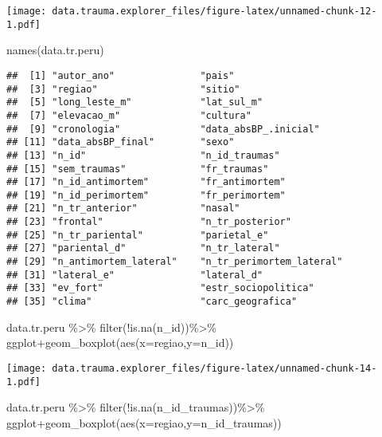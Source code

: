 \documentclass[
]{article}
\newenvironment{Shaded}{\begin{snugshade}}{\end{snugshade}}
\newcommand{\AttributeTok}[1]{\textcolor[rgb]{0.77,0.63,0.00}{#1}}
\newcommand{\FunctionTok}[1]{\textcolor[rgb]{0.00,0.00,0.00}{#1}}
\newcommand{\NormalTok}[1]{#1}
\newcommand{\SpecialCharTok}[1]{\textcolor[rgb]{0.00,0.00,0.00}{#1}}
\begin{document}
\texttt{[image: data.trauma.explorer\_files/figure-latex/unnamed-chunk-12-1.pdf]}

\begin{Shaded}
\begin{Highlighting}[]
\FunctionTok{names}\NormalTok{(data.tr.peru)}
\end{Highlighting}
\end{Shaded}

\begin{verbatim}
##  [1] "autor_ano"               "pais"                   
##  [3] "regiao"                  "sitio"                  
##  [5] "long_leste_m"            "lat_sul_m"              
##  [7] "elevacao_m"              "cultura"                
##  [9] "cronologia"              "data_absBP_.inicial"    
## [11] "data_absBP_final"        "sexo"                   
## [13] "n_id"                    "n_id_traumas"           
## [15] "sem_traumas"             "fr_traumas"             
## [17] "n_id_antimortem"         "fr_antimortem"          
## [19] "n_id_perimortem"         "fr_perimortem"          
## [21] "n_tr_anterior"           "nasal"                  
## [23] "frontal"                 "n_tr_posterior"         
## [25] "n_tr_pariental"          "parietal_e"             
## [27] "pariental_d"             "n_tr_lateral"           
## [29] "n_antimortem_lateral"    "n_tr_perimortem_lateral"
## [31] "lateral_e"               "lateral_d"              
## [33] "ev_fort"                 "estr_sociopolitica"     
## [35] "clima"                   "carc_geografica"
\end{verbatim}

\begin{Shaded}
\begin{Highlighting}[]
\NormalTok{data.tr.peru }\SpecialCharTok{\%\textgreater{}\%} \FunctionTok{filter}\NormalTok{(}\SpecialCharTok{!}\FunctionTok{is.na}\NormalTok{(n\_id))}\SpecialCharTok{\%\textgreater{}\%}\NormalTok{ ggplot}\SpecialCharTok{+}\FunctionTok{geom\_boxplot}\NormalTok{(}\FunctionTok{aes}\NormalTok{(}\AttributeTok{x=}\NormalTok{regiao,}\AttributeTok{y=}\NormalTok{n\_id))}
\end{Highlighting}
\end{Shaded}

\texttt{[image: data.trauma.explorer\_files/figure-latex/unnamed-chunk-14-1.pdf]}

\begin{Shaded}
\begin{Highlighting}[]
\NormalTok{data.tr.peru }\SpecialCharTok{\%\textgreater{}\%} \FunctionTok{filter}\NormalTok{(}\SpecialCharTok{!}\FunctionTok{is.na}\NormalTok{(n\_id\_traumas))}\SpecialCharTok{\%\textgreater{}\%}\NormalTok{ ggplot}\SpecialCharTok{+}\FunctionTok{geom\_boxplot}\NormalTok{(}\FunctionTok{aes}\NormalTok{(}\AttributeTok{x=}\NormalTok{regiao,}\AttributeTok{y=}\NormalTok{n\_id\_traumas))}
\end{Highlighting}
\end{Shaded}
\end{document}
